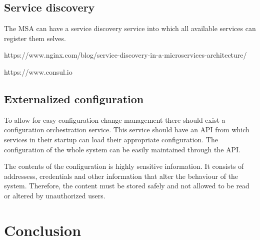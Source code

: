 \subsection{Service discovery}
\begin{sloppypar}
    The MSA can have a service discovery service into which all available services 
    can register them selves.

    https://www.nginx.com/blog/service-discovery-in-a-microservices-architecture/

    https://www.consul.io


\end{sloppypar}

\subsection{Externalized configuration}
\begin{sloppypar}
    To allow for easy configuration change management there should exist a 
    configuration orchestration service. This service should have an API from 
    which services in their startup can load their appropriate configuration. 
    The configuration of the whole system can be easily maintained through the 
    API.

    The contents of the configuration is highly sensitive information. It 
    consists of addressess, credentials and other information that alter 
    the behaviour of the system. Therefore, the content must be stored safely 
    and not allowed to be read or altered by unauthorized users.
\end{sloppypar}





\section{Conclusion}


